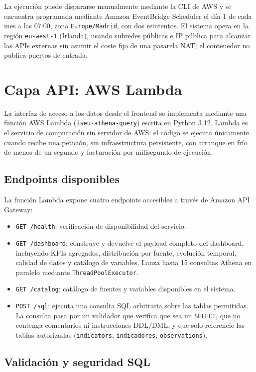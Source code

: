 La ejecución puede dispararse manualmente mediante la CLI de AWS y se encuentra programada mediante Amazon EventBridge Scheduler el día 1 de cada mes a las 07:00, zona \texttt{Europe/Madrid}, con dos reintentos. El sistema opera en la región \texttt{eu-west-1} (Irlanda), usando subredes públicas e IP pública para alcanzar las APIs externas sin asumir el coste fijo de una pasarela NAT; el contenedor no publica puertos de entrada.

\section{Capa API: AWS Lambda}

La interfaz de acceso a los datos desde el frontend se implementa mediante una función AWS Lambda (\texttt{iseu-athena-query}) escrita en Python 3.12. Lambda es el servicio de computación sin servidor de AWS: el código se ejecuta únicamente cuando recibe una petición, sin infraestructura persistente, con arranque en frío de menos de un segundo y facturación por milisegundo de ejecución.

\subsection{Endpoints disponibles}

La función Lambda expone cuatro endpoints accesibles a través de Amazon API Gateway:

\begin{itemize}
  \item \texttt{GET /health}: verificación de disponibilidad del servicio.
  \item \texttt{GET /dashboard}: construye y devuelve el payload completo del dashboard, incluyendo KPIs agregados, distribución por fuente, evolución temporal, calidad de datos y catálogo de variables. Lanza hasta 15 consultas Athena en paralelo mediante \texttt{ThreadPoolExecutor}.
  \item \texttt{GET /catalog}: catálogo de fuentes y variables disponibles en el sistema.
  \item \texttt{POST /sql}: ejecuta una consulta SQL arbitraria sobre las tablas permitidas. La consulta pasa por un validador que verifica que sea un \texttt{SELECT}, que no contenga comentarios ni instrucciones DDL/DML, y que solo referencie las tablas autorizadas (\texttt{indicators}, \texttt{indicadores}, \texttt{observations}).
\end{itemize}

\subsection{Validación y seguridad SQL}

